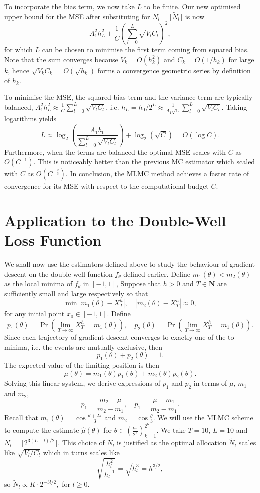 \documentclass{article}
\begin{document}
To incorporate the bias term, we now take \(L\) to be finite. Our new optimised upper bound for the MSE after substituting for \(N_l = \lfloor \tilde{N}_l \rfloor\) is now
\[ A_1^2h_L^2 + \frac{1}{C}\left(\sum_{l=0}^L \sqrt{V_lC_l}\right)^2, \]
for which \(L\) can be chosen to minimise the first term coming from squared bias. Note that the sum converges because \(V_k = O(h_k^2)\) and \(C_k = O(1/h_k)\) for large \(k\), hence \(\sqrt{V_kC_k} = O(\sqrt{h_k})\) forms a convergence geometric series by definition of \(h_k\).

To minimise the MSE, the squared bias term and the variance term are typically balanced, \(A_1^2h_L^2 \approx \frac{1}{C} \sum_{l=0}^L \sqrt{V_lC_l}\), i.e. \(h_L = h_0/2^L \approx \frac{1}{A_1\sqrt{C}}\sum_{l=0}^L \sqrt{V_lC_l}\). Taking logarithms yields
\[ L \approx \log_2\left(\frac{A_1h_0}{\sum_{l=0}^L \sqrt{V_lC_l}}\right) + \log_2(\sqrt{C}) = O(\log C). \]
Furthermore, when the terms are balanced the optimal MSE scales with \(C\) as \(O(C^{-1})\). This is noticeably better than the previous MC estimator which scaled with \(C\) as \(O(C^{-\frac{2}{3}})\). In conclusion, the MLMC method achieves a faster rate of convergence for its MSE with respect to the computational budget \(C\).

\section{Application to the Double-Well Loss Function}

We shall now use the estimators defined above to study the behaviour of gradient descent on the double-well function \(f_\theta\) defined earlier. Define \(m_1(\theta) < m_2(\theta)\) as the local minima of \(f_\theta\) in \([-1, 1]\), Suppose that \(h > 0\) and \(T \in \mathbf{N}\) are sufficiently small and large respectively so that
\[ \min{|m_1(\theta) - X^h_T|, \quad |m_2(\theta) - X^h_T|} \approx 0, \]
for any initial point \(x_0 \in [-1, 1]\). Define
\[ p_1(\theta) = \Pr\left(\lim_{T \to \infty} X^h_T = m_1(\theta)\right), \quad p_2(\theta) = \Pr\left(\lim_{T \to \infty} X^h_T = m_1(\theta)\right). \]
Since each trajectory of gradient descent converges to exactly one of the to minima, i.e. the events are mutually exclusive, then 
\[ p_1(\theta) + p_2(\theta) = 1. \]
The expected value of the limiting position is then
\[ \mu(\theta) = m_1(\theta)p_1(\theta) + m_2(\theta)p_2(\theta). \]
Solving this linear system, we derive expressions of \(p_1\) and \(p_2\) in terms of \(\mu\), \(m_1\) and \(m_2\),
\[ p_1 = \frac{m_2 - \mu}{m_2 - m_1}, \quad p_1 = \frac{\mu - m_1}{m_2 - m_1}.  \]
Recall that \(m_1(\theta) = \cos\frac{\theta + 2\pi}{3}\) and \(m_2 = \cos\frac{\theta}{3}\). We will use the MLMC scheme to compute the estimate \(\hat\mu(\theta)\) for \(\theta \in (\frac{k\pi}{2^7})_{k=1}^{2^6}\). We take \(T = 10\), \(L = 10\) and \(N_l = \lfloor 2^{3(L-l)/2}\rfloor\). This choice of \(N_l\) is justified as the optimal allocation \(\tilde{N}_l\) scales like \(\sqrt{V_l/C_l}\) which in turns scales like
\[ \sqrt{\frac{h_l^2}{h_{l}^{-1}}} = \sqrt{h_l^3} = h^{3/2}, \]
so \(\tilde{N}_l \propto K\cdot2^{-3l/2}, \) for \(l \geq 0\).
\end{document}
